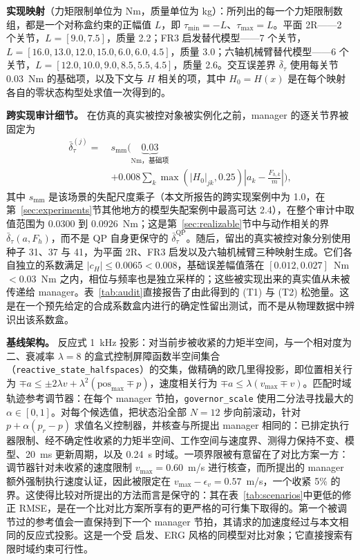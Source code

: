 \documentclass[journal]{IEEEtran}
\begin{document}
\textbf{实现映射}（力矩限制单位为 Nm，质量单位为 kg）：所列出的每一个力矩限制数组，都是一个对称盒约束的正幅值 $L$，即 $\tau_{\min}=-L$、$\tau_{\max}=L$。平面 2R——2 个关节，$L=[9.0,7.5]$，质量 2.2；FR3 启发替代模型——7 个关节，$L=[16.0,13.0,12.0,15.0,6.0,6.0,4.5]$，质量 3.0；六轴机械臂替代模型——6 个关节，$L=[12.0,10.0,9.0,8.5,5.5,4.5]$，质量 2.6。交互误差界 $\bar\delta_\tau$ 使用每关节 0.03~Nm 的基础项，以及下文与 $H$ 相关的项，其中 $H_0=H(x)$ 是在每个映射各自的零状态构型处求值一次得到的。

\textbf{跨实现审计细节。} 在仿真的真实被控对象被实例化之前，manager 的逐关节界被固定为
\begin{align*}
\bar\delta_\tau^{(j)}
=\ &s_{\mathrm{mm}}\Bigg(\underbrace{0.03}_{\text{Nm，基础项}} \\
&+0.008\sum_{k}\max\!\left(\left|H_0\right|_{jk},0.25\right)\left|a_k-\frac{F_{h,k}}{m}\right|\Bigg),
\end{align*}
其中 $s_{\mathrm{mm}}$ 是该场景的失配尺度乘子（本文所报告的跨实现案例中为 1.0，在第~\ref{sec:experiments}节其他地方的模型失配案例中最高可达 2.4），在整个审计中取值范围为 0.0300 到 0.0926~Nm；这是第~\ref{sec:realizable}节中与动作相关的界 $\bar\delta_\tau(a,F_h)$，而不是 QP 自身更保守的 $\bar\delta_\tau^{\mathrm{QP}}$。随后，留出的真实被控对象分别使用种子 31、37 与 41，为平面 2R、FR3 启发以及六轴机械臂三种映射生成。它们各自独立的系数满足 $|c_H|\le0.0065<0.008$，基础误差幅值落在 $[0.012,0.027]$~Nm${}<0.03$~Nm 之内，相位与频率也是独立采样的；这些被实现出来的真实值从未被传递给 manager。表~\ref{tab:audit}直接报告了由此得到的 (T1) 与 (T2) 松弛量。这是在一个预先给定的合成系数盒内进行的确定性留出测试，而不是从物理数据中辨识出该系数盒。

\textbf{基线架构。} 反应式 1~kHz 投影：对当前步被收紧的力矩半空间，与一个相对度为二、衰减率 $\lambda=8$ 的盒式控制屏障函数半空间集合（\texttt{reactive\_state\_halfspaces}）的交集，做精确的欧几里得投影，即位置相关行为 $\mp a\le\pm2\lambda v+\lambda^2(\mathrm{pos}_{\max}\mp p)$，速度相关行为 $\mp a\le\lambda(v_{\max}\mp v)$。匹配时域轨迹参考调节器：在每个 manager 节拍，\texttt{governor\_scale} 使用二分法寻找最大的 $\alpha\in[0,1]$。对每个候选值，把状态沿全部 $N=12$ 步向前滚动，针对 $p+\alpha(p_r-p)$ 求值名义控制器，并核查与所提出 manager 相同的：已排定执行器限制、经不确定性收紧的力矩半空间、工作空间与速度界、测得力保持不变、模型、20~ms 更新周期，以及 0.24~s 时域。一项界限被有意留在了对比方案一方：调节器针对未收紧的速度限制 $v_{\max}=0.60$~m/s 进行核查，而所提出的 manager 额外强制执行速度认证，因此被限定在 $v_{\max}-\epsilon_v=0.57$~m/s，一个收紧 5\% 的界。这使得比较对所提出的方法而言是保守的：其在表~\ref{tab:scenarios}中更低的修正 RMSE，是在一个比对比方案所享有的更严格的可行集下取得的。第一个被调节过的参考值会一直保持到下一个 manager 节拍，其请求的加速度经过与本文相同的反应式投影。这是一个受 \cite{r17} 启发、ERG 风格的同模型对比对象；它直接搜索有限时域约束可行性。
\end{document}
